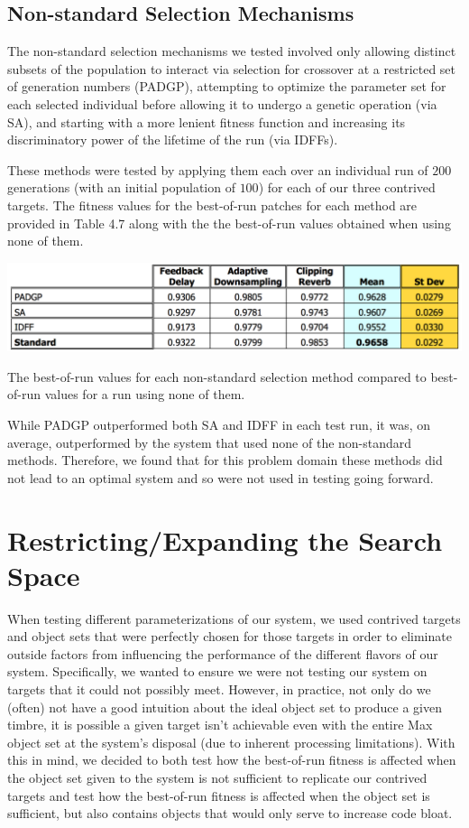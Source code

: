 \documentclass[a4paper,12pt]{report} 	%
\numberwithin{figure}{chapter}
\numberwithin{table}{chapter}
\numberwithin{equation}{chapter}
\begin{document}
\begin{flushleft}
\subsection{Non-standard Selection Mechanisms}
The non-standard selection mechanisms we tested involved only allowing distinct subsets of the population to interact via selection for crossover at a restricted set of generation numbers (PADGP), attempting to optimize the parameter set for each selected individual before allowing it to undergo a genetic operation (via SA), and starting with a more lenient fitness function and increasing its discriminatory power of the lifetime of the run (via IDFFs).

These methods were tested by applying them each over an individual run of $200$ generations (with an initial population of $100$) for each of our three contrived targets. The fitness values for the best-of-run patches for each method are provided in Table 4.7 along with the the best-of-run values obtained when using none of them.
\begin{table}[h!]
\begin{center}
\includegraphics[scale=0.6,width=\linewidth]{NonStandardSelectionTable}
\caption[Non-standard Selection Best-of-Run Values]{The best-of-run values for each non-standard selection method compared to best-of-run values for a run using none of them.}
\end{center}
\end{table}
While PADGP outperformed both SA and IDFF in each test run, it was, on average, outperformed by the system that used none of the non-standard methods. Therefore, we found that for this problem domain these methods did not lead to an optimal system and so were not used in testing going forward.

\section{Restricting/Expanding the Search Space}
When testing different parameterizations of our system, we used contrived targets and object sets that were perfectly chosen for those targets in order to eliminate outside factors from influencing the performance of the different flavors of our system. Specifically, we wanted to ensure we were not testing our system on targets that it could not possibly meet. However, in practice, not only do we (often) not have a good intuition about the ideal object set to produce a given timbre, it is possible a given target isn't achievable even with the entire Max object set at the system's disposal (due to inherent processing limitations). With this in mind, we decided to both test how the best-of-run fitness is affected when the object set given to the system is not sufficient to replicate our contrived targets and test how the best-of-run fitness is affected when the object set is sufficient, but also contains objects that would only serve to increase code bloat.


\end{flushleft}
\end{document}
